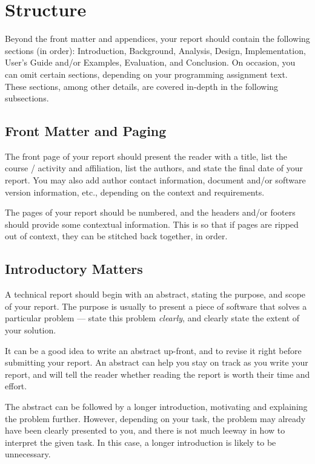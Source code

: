 \section{Structure}

\label{sec:structure}

Beyond the front matter and appendices, your report should contain the
following sections (in order): Introduction, Background, Analysis,
Design, Implementation, User's Guide and/or Examples, Evaluation, and
Conclusion. On occasion, you can omit certain sections, depending on
your programming assignment text. These sections, among other details,
are covered in-depth in the following subsections.

\subsection{Front Matter and Paging}

The front page of your report should present the reader with a title,
list the course / activity and affiliation, list the authors, and
state the final date of your report. You may also add author contact
information, document and/or software version information, etc.,
depending on the context and requirements.

The pages of your report should be numbered, and the headers and/or footers
should provide some contextual information. This is so that if pages are ripped
out of context, they can be stitched back together, in order.

\subsection{Introductory Matters}

A technical report should begin with an abstract, stating the purpose,
and scope of your report. The purpose is usually to present a piece of
software that solves a particular problem --- state this problem
\emph{clearly}, and clearly state the extent of your solution.

It can be a good idea to write an abstract up-front, and to revise it
right before submitting your report. An abstract can help you stay on
track as you write your report, and will tell the reader whether
reading the report is worth their time and effort.

The abstract can be followed by a longer introduction, motivating and
explaining the problem further. However, depending on your task, the
problem may already have been clearly presented to you, and there is
not much leeway in how to interpret the given task. In this case, a
longer introduction is likely to be unnecessary.

